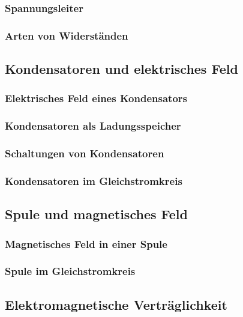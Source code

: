 \subsubsection{Spannungsleiter}
\subsubsection{Arten von Widerständen}

\subsection{Kondensatoren und elektrisches Feld}
\subsubsection{Elektrisches Feld eines Kondensators}
\subsubsection{Kondensatoren als Ladungsspeicher}
\subsubsection{Schaltungen von Kondensatoren}
\subsubsection{Kondensatoren im Gleichstromkreis}

\subsection{Spule und magnetisches Feld}
\subsubsection{Magnetisches Feld in einer Spule}
\subsubsection{Spule im Gleichstromkreis}

\subsection{Elektromagnetische Verträglichkeit}

